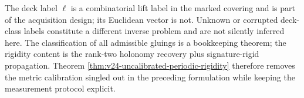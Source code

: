 \begin{remark}
\label{rem:v24-deck-operational}
The deck label \(\ell\) is a combinatorial lift label in the marked covering
and is part of the acquisition design; its Euclidean vector is not.  Unknown
or corrupted deck-class labels constitute a different inverse problem and are
not silently inferred here.  The classification of all admissible gluings is
a bookkeeping theorem; the rigidity content is the rank-two holonomy recovery
plus signature-rigid propagation.  Theorem
\ref{thm:v24-uncalibrated-periodic-rigidity} therefore removes the metric
calibration singled out in the preceding formulation while keeping the
measurement protocol explicit.
\end{remark}
